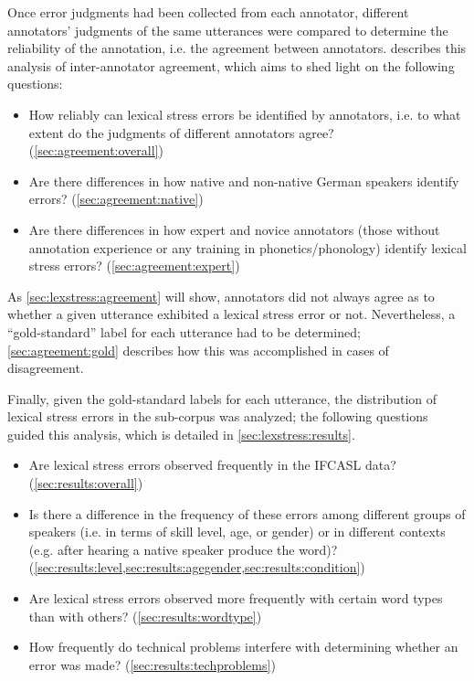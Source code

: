 	Once error judgments had been collected from each annotator, different annotators' judgments of the same utterances were compared to determine the reliability of the annotation, i.e. the agreement between annotators.
	 describes this analysis of inter-annotator agreement, which aims to shed light on the following questions:
	\begin{itemize}
	\item{How reliably can lexical stress errors be identified by
	annotators, i.e. to what extent do the judgments of different annotators agree?  (\cref{sec:agreement:overall})}
	\item{Are there differences in how native and non-native German speakers identify errors?  (\cref{sec:agreement:native})}
	\item{Are there differences in how expert and novice annotators (those without annotation experience or any training in phonetics/phonology) identify lexical stress errors?  (\cref{sec:agreement:expert})} 
	\end{itemize}
	As \cref{sec:lexstress:agreement} will show, annotators did not always agree as to whether a given utterance exhibited a lexical stress error or not. Nevertheless, a ``gold-standard'' label for each utterance had to be determined; \cref{sec:agreement:gold} describes how this was accomplished in cases of disagreement.
	
	Finally, given the gold-standard labels for each utterance, the distribution of lexical stress errors in the sub-corpus was analyzed; the following questions guided this analysis, which is detailed in \cref{sec:lexstress:results}.
	\begin{itemize}
	\item{Are lexical stress errors observed frequently in the IFCASL data? (\cref{sec:results:overall})}
	\item{Is there a difference in the frequency of these errors among different groups of speakers (i.e. in terms of skill level, age, or gender) or in different contexts (e.g. after hearing a native speaker produce the word)?  (\cref{sec:results:level,sec:results:agegender,sec:results:condition})}
	\item{Are lexical stress errors observed more frequently with certain word types than with others?  (\cref{sec:results:wordtype})}
	\item{How frequently do technical problems interfere with determining whether an error was made?  (\cref{sec:results:techproblems})}
	\end{itemize}
	
